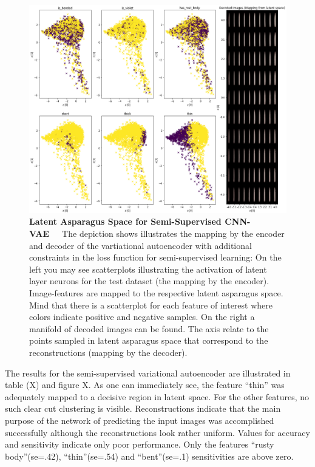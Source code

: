 \begin{figure}[h]
	\centering
	\includegraphics[scale=0.35]{Figures/chapter04/semi_supervised_latent_asparagus.png}
	\decoRule
	\caption[Latent Asparagus Space for Semi-Supervised CNN-VAE]{\textbf{Latent Asparagus Space for Semi-Supervised CNN-VAE}~~~The depiction shows illustrates the mapping by the encoder and decoder of the vartiational autoencoder with additional constraints in the loss function for semi-supervised learning: On the left you may see scatterplots illustrating the activation of latent layer neurons for the test dataset (the mapping by the encoder). Image-features are mapped to the respective latent asparagus space. Mind that there is a scatterplot for each feature of interest where colors indicate positive and negative samples. On the right a manifold of decoded images can be found. The axis relate to the points sampled in latent asparagus space that correspond to the reconstructions (mapping by the decoder).}
	\label{fig:SemiSupervisedLatentSpace}
\end{figure}


The results for the semi-supervised variational autoencoder are illustrated in table (X) and figure X. As one can immediately see, the feature “thin” was adequately mapped to a decisive region in latent space. For the other features, no such clear cut clustering is visible. Reconstructions indicate that the main purpose of the network of predicting the input images was accomplished successfully although the reconstructions look rather uniform. Values for accuracy and sensitivity indicate only poor performance. Only the features “rusty body”(se=.42), “thin”(se=.54) and “bent”(se=.1) sensitivities are above zero. \\


